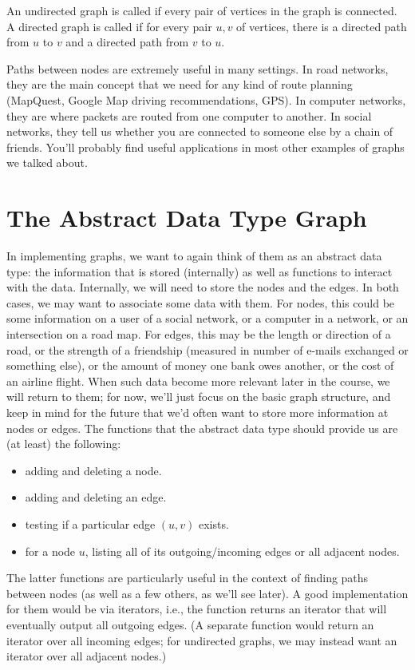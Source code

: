 An undirected graph is called  if every pair of
vertices in the graph is connected.
A directed graph is called  if for every pair
$u,v$ of vertices, there is a directed path from $u$ to $v$ and a
directed path from $v$ to $u$.

Paths between nodes are extremely useful in many settings.
In road networks, they are the main concept that we need for any kind
of route planning (MapQuest, Google Map driving recommendations, GPS).
In computer networks, they are where packets are routed from one
computer to another.
In social networks, they tell us whether you are connected to someone
else by a chain of friends. You'll probably find useful applications
in most other examples of graphs we talked about.

\section{The Abstract Data Type Graph}
In implementing graphs, we want to again think of them as an abstract
data type: the information that is stored (internally) as well as
functions to interact with the data.
Internally, we will need to store the nodes and the edges. 
In both cases, we may want to associate some data with them.
For nodes, this could be some information on a user of a social
network, or a computer in a network, or an intersection on a road map.
For edges, this may be the length or direction of a road, or the
strength of a friendship (measured in number of e-mails exchanged or
something else), or the amount of money one bank owes another, or the
cost of an airline flight.
When such data become more relevant later in the course, we will
return to them; for now, we'll just focus on the basic graph
structure, and keep in mind for the future that we'd often want to
store more information at nodes or edges.
The functions that the abstract data type should provide us are (at
least) the following:

\begin{itemize}
\item adding and deleting a node.
\item adding and deleting an edge.
\item testing if a particular edge $(u,v)$ exists.
\item for a node $u$, listing all of its outgoing/incoming edges or
  all adjacent nodes.
\end{itemize}

The latter functions are particularly useful in the context of finding
paths between nodes (as well as a few others, as we'll see later).
A good implementation for them would be via iterators, i.e., the
function returns an iterator that will eventually output all
outgoing edges. (A separate function would return an iterator over all
incoming edges; for undirected graphs, we may instead want an iterator
over all adjacent nodes.)

